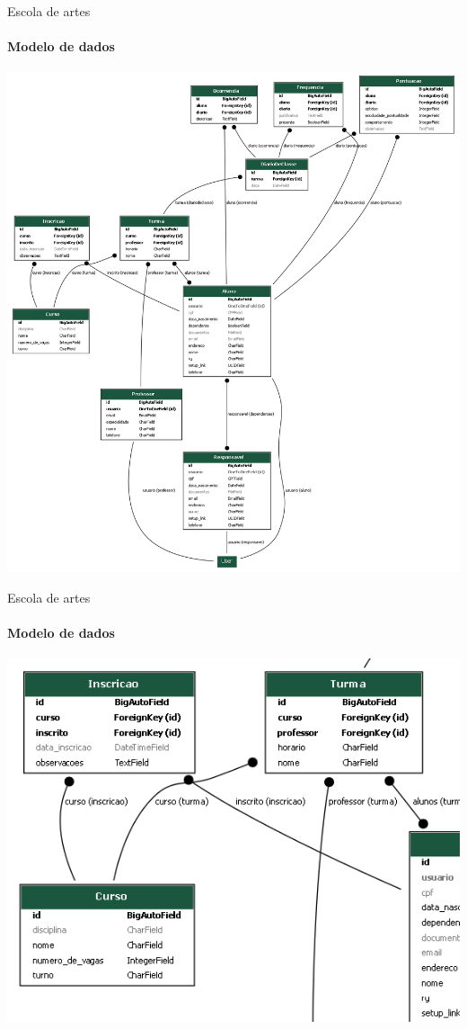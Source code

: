 \begin{frame}{Escola de artes}
\framesubtitle{Modelo de dados}

\begin{center}
\includegraphics[height=\textheight]{beamerthemesrc/assets/er_diagram_escola.png}
\end{center}


\end{frame}

\begin{frame}{Escola de artes}
\framesubtitle{Modelo de dados}

\begin{center}
\includegraphics[height=\textheight]{beamerthemesrc/assets/er_diagram_escola_turma.png}
\end{center}


\end{frame}


